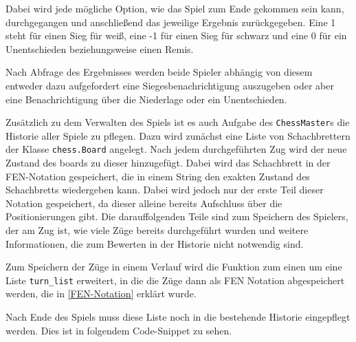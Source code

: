     Dabei wird jede mögliche Option, wie das Spiel zum Ende gekommen sein
kann, durchgegangen und anschließend das jeweilige Ergebnis
zurückgegeben. Eine 1 steht für einen Sieg für weiß, eine -1 für einen
Sieg für schwarz und eine 0 für ein Unentschieden beziehungsweise einen
Remis.

Nach Abfrage des Ergebnisses werden beide Spieler abhängig von diesem
entweder dazu aufgefordert eine Siegesbenachrichtigung auszugeben oder
aber eine Benachrichtigung über die Niederlage oder ein Unentschieden.

Zusätzlich zu dem Verwalten des Spiels ist es auch Aufgabe des
\texttt{ChessMaster}s die Historie aller Spiele zu pflegen. Dazu wird
zunächst eine Liste von Schachbrettern der Klasse \texttt{chess.Board}
angelegt. Nach jedem durchgeführten Zug wird der neue Zustand des boards
zu dieser hinzugefügt. Dabei wird das Schachbrett in der FEN-Notation
gespeichert, die in einem String den exakten Zustand des Schachbretts
wiedergeben kann. Dabei wird jedoch nur der erste Teil dieser Notation
gespeichert, da dieser alleine bereits Aufschluss über die
Positionierungen gibt. Die darauffolgenden Teile sind zum Speichern des
Spielers, der am Zug ist, wie viele Züge bereits durchgeführt wurden und
weitere Informationen, die zum Bewerten in der Historie nicht notwendig
sind.

Zum Speichern der Züge in einem Verlauf wird die Funktion zum einen um
eine Liste \texttt{turn\_list} erweitert, in die die Züge dann als
FEN Notation abgespeichert werden, die in \ref{FEN-Notation} erklärt wurde.

    Nach Ende des Spiels muss diese Liste noch in die bestehende Historie
eingepflegt werden. Dies ist in folgendem Code-Snippet zu sehen.

